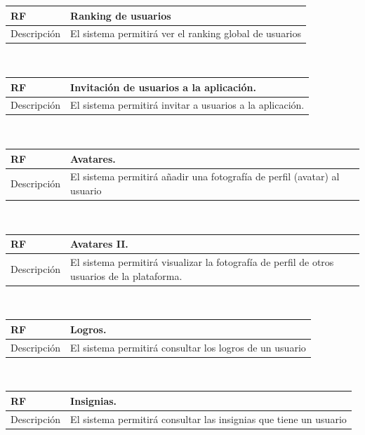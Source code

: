 \documentclass[twoside]{report}
\newcommand\addrow[2]{#1 &#2\\ }
\newcommand\addheading[2]{#1 &#2\\ \hline}
\newcommand\tabularhead{\begin{tabular}{lp{0.7\textwidth}}
\hline
}
\newenvironment{req}{\tabularhead}
{\hline\end{tabular}}
\begin{document}
\vspace{0.25cm}

\begin{req}
	\addheading{\textbf{RF\arabic{functionalRequirements}}}{Ranking de usuarios}
	\addrow{Descripción}{El sistema permitirá ver el ranking global de usuarios}
\end{req}\\

\vspace{0.25cm}

\begin{req}
	\addheading{\textbf{RF\arabic{functionalRequirements}}}{Invitación de usuarios a la aplicación.}
	\addrow{Descripción}{El sistema permitirá invitar a usuarios a la aplicación.}
\end{req}\\

\vspace{0.25cm}

\begin{req}
	\addheading{\textbf{RF\arabic{functionalRequirements}}}{Avatares.}
	\addrow{Descripción}{El sistema permitirá añadir una fotografía de perfil (avatar) al usuario}
\end{req}\\

\vspace{0.25cm}

\begin{req}
	\addheading{\textbf{RF\arabic{functionalRequirements}}}{Avatares II.}
	\addrow{Descripción}{El sistema permitirá visualizar la fotografía de perfil de otros usuarios de la plataforma.}
\end{req}\\

\vspace{0.25cm}

\begin{req}
	\addheading{\textbf{RF\arabic{functionalRequirements}}}{Logros.}
	\addrow{Descripción}{El sistema permitirá consultar los logros de un usuario}
\end{req}\\

\vspace{0.25cm}

\begin{req}
	\addheading{\textbf{RF\arabic{functionalRequirements}}}{Insignias.}
	\addrow{Descripción}{El sistema permitirá consultar las insignias que tiene un usuario}
\end{req}\\
\end{document}
